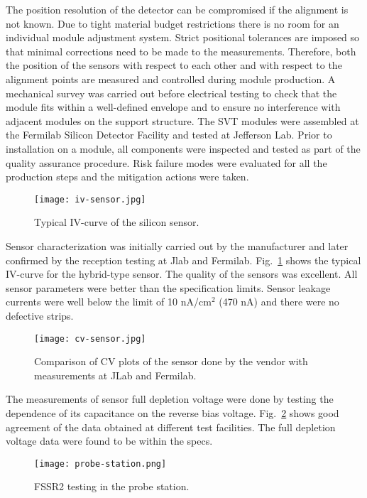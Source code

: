 The position resolution of the detector can be compromised if the alignment is not known. Due to tight material budget restrictions there is no room for an individual module adjustment system. Strict positional tolerances are imposed so that minimal corrections need to be made to the measurements. Therefore, both the position of the sensors with respect to each other and with respect to the alignment points are measured and controlled during module production. A mechanical survey was  carried out before electrical testing to check that the module fits within a well-defined envelope and to ensure no interference with adjacent modules on the support structure. The SVT modules were assembled at the Fermilab Silicon Detector Facility and tested at Jefferson Lab. Prior to installation on a module, all components were inspected and tested as part of the quality assurance procedure. Risk failure modes were evaluated for all the production steps and the mitigation actions were taken.

\begin{figure}[hbt] 
\centering 
\texttt{[image: iv-sensor.jpg]}
\caption{Typical IV-curve of the silicon sensor.}
\label{fig:iv-sensor}
\end{figure}

Sensor characterization was initially carried out by the manufacturer and later confirmed by the reception testing at Jlab and Fermilab. Fig.~\ref{fig:iv-sensor} shows the typical IV-curve for the hybrid-type sensor. The quality of the sensors was excellent. All sensor parameters were better than the specification limits. Sensor leakage currents were well below the limit of 10 nA/cm$^2$ (470 nA) and there were no defective strips. 

\begin{figure}[hbt] 
\centering 
\texttt{[image: cv-sensor.jpg]}
\caption{Comparison of CV plots of the sensor done by the vendor with measurements at JLab and Fermilab.}
\label{fig:cv-sensor}
\end{figure}

The measurements of sensor full depletion voltage were done by testing the dependence of its capacitance on the reverse bias voltage. Fig.~\ref{fig:cv-sensor} shows good agreement of the data obtained at different test facilities. The full depletion voltage data were found to be within the specs. 

\begin{figure}[hbt] 
\centering 
\texttt{[image: probe-station.png]}
\caption{FSSR2 testing in the probe station.}
\label{fig:probe-station}
\end{figure}

